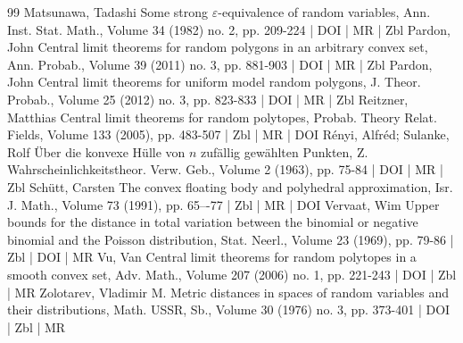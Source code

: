 \begin{thebibliography}{99}
 Matsunawa, Tadashi Some strong $\varepsilon $-equivalence of random variables, Ann. Inst. Stat. Math., Volume 34 (1982) no. 2, pp. 209-224 | DOI | MR | Zbl
 Pardon, John Central limit theorems for random polygons in an arbitrary convex set, Ann. Probab., Volume 39 (2011) no. 3, pp. 881-903 | DOI | MR | Zbl
 Pardon, John Central limit theorems for uniform model random polygons, J. Theor. Probab., Volume 25 (2012) no. 3, pp. 823-833 | DOI | MR | Zbl
 Reitzner, Matthias Central limit theorems for random polytopes, Probab. Theory Relat. Fields, Volume 133 (2005), pp. 483-507 | Zbl | MR | DOI
 Rényi, Alfréd; Sulanke, Rolf Über die konvexe Hülle von $n$ zufällig gewählten Punkten, Z. Wahrscheinlichkeitstheor. Verw. Geb., Volume 2 (1963), pp. 75-84 | DOI | MR | Zbl
 Schütt, Carsten The convex floating body and polyhedral approximation, Isr. J. Math., Volume 73 (1991), pp. 65–-77 | Zbl | MR | DOI
 Vervaat, Wim Upper bounds for the distance in total variation between the binomial or negative binomial and the Poisson distribution, Stat. Neerl., Volume 23 (1969), pp. 79-86 | Zbl | DOI | MR
 Vu, Van Central limit theorems for random polytopes in a smooth convex set, Adv. Math., Volume 207 (2006) no. 1, pp. 221-243 | DOI | Zbl | MR
 Zolotarev, Vladimir M. Metric distances in spaces of random variables and their distributions, Math. USSR, Sb., Volume 30 (1976) no. 3, pp. 373-401 | DOI | Zbl | MR
\end{thebibliography}
